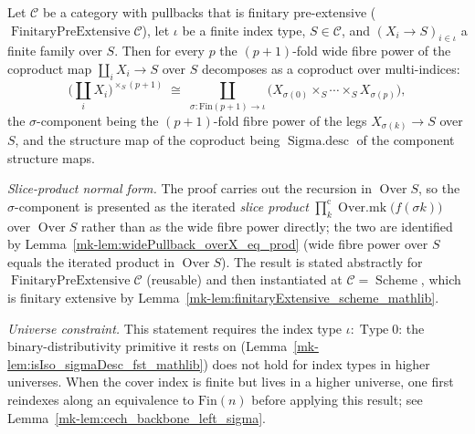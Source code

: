 \begin{lemma}
  \label{mk-lem:coproduct_distrib_fibrePower}

  Let \(\mathcal{C}\) be a category with pullbacks that is finitary pre-extensive
  (\(\operatorname{FinitaryPreExtensive}\mathcal{C}\)), let \(\iota\) be a finite index type,
  \(S \in \mathcal{C}\), and \((X_i \to S)_{i \in \iota}\) a finite family over \(S\). Then for every
  \(p\) the \((p+1)\)-fold wide fibre power of the coproduct map \(\coprod_i X_i \to S\) over \(S\)
  decomposes as a coproduct over multi-indices:
  \[
    \bigl(\textstyle\coprod_{i} X_i\bigr)^{\times_S (p+1)}
      \;\cong\;
    \coprod_{\sigma : \mathrm{Fin}(p+1) \to \iota}
      \bigl(X_{\sigma(0)} \times_S \cdots \times_S X_{\sigma(p)}\bigr),
  \]
  the \(\sigma\)-component being the \((p+1)\)-fold fibre power of the legs \(X_{\sigma(k)} \to S\)
  over \(S\), and the structure map of the coproduct being
  \(\operatorname{Sigma.desc}\) of the component structure maps.

  \emph{Slice-product normal form.} The proof carries out the recursion in
  \(\operatorname{Over} S\), so the \(\sigma\)-component is presented as the iterated \emph{slice
  product} \(\prod^{\mathrm{c}}_{k}\operatorname{Over.mk}\bigl(f(\sigma k)\bigr)\) over
  \(\operatorname{Over} S\) rather than as the wide fibre power directly; the two are identified by
  Lemma~\ref{mk-lem:widePullback_overX_eq_prod} (wide fibre power over \(S\) equals the iterated product in
  \(\operatorname{Over} S\)). The result is stated
  abstractly for \(\operatorname{FinitaryPreExtensive}\mathcal{C}\) (reusable)
  and then instantiated at \(\mathcal{C} = \operatorname{Scheme}\), which is finitary extensive by
  Lemma~\ref{mk-lem:finitaryExtensive_scheme_mathlib}.

  \emph{Universe constraint.} This statement requires the index type \(\iota : \operatorname{Type} 0\):
  the binary-distributivity primitive it rests on (Lemma~\ref{mk-lem:isIso_sigmaDesc_fst_mathlib}) does not
  hold for index types in higher universes. When the cover index is finite but lives in a higher
  universe, one first reindexes along an equivalence to \(\mathrm{Fin}(n)\) before applying this
  result; see Lemma~\ref{mk-lem:cech_backbone_left_sigma}.
\end{lemma}
